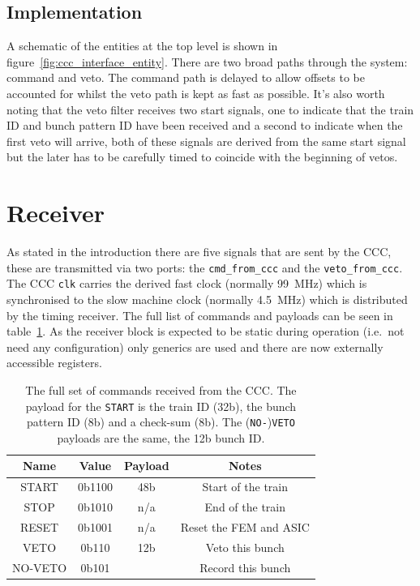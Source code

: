 \subsection{Implementation} %
\label{sub:top_implementation}
A schematic of the entities at the top level is shown in figure~\ref{fig:ccc_interface_entity}. There are two broad paths through the system: command and veto. The command path is delayed to allow offsets to be accounted for whilst the veto path is kept as fast as possible. It's also worth noting that the veto filter receives two start signals, one to indicate that the train ID and bunch pattern ID have been received and a second to indicate when the first veto will arrive, both of these signals are derived from the same start signal but the later has to be carefully timed to coincide with the beginning of vetos.

\section{Receiver} %
\label{sec:receiver}
As stated in the introduction there are five signals that are sent by the CCC, these are transmitted via two ports: the \texttt{cmd\_from\_ccc} and the \texttt{veto\_from\_ccc}. The CCC \texttt{clk} carries the derived fast clock (normally 99~MHz) which is synchronised to the slow machine clock (normally 4.5~MHz) which is distributed by the timing receiver. The full list of commands and payloads can be seen in table~\ref{tab:ccc_commands}. As the receiver block is expected to be static during operation (i.e.\ not need any configuration) only generics are used and there are now externally accessible registers.
\begin{table}[htbp]
  \begin{center}
  \begin{tabular}{c | c | c | c}
    Name     & Value  & Payload & Notes \\
    \hline
    START    & 0b1100 & 48b     & Start of the train \\
    STOP     & 0b1010 & n/a     & End of the train \\
    RESET    & 0b1001 & n/a     & Reset the FEM and ASIC \\
    \hline
    VETO     & 0b110  & 12b     & Veto this bunch \\
    NO-VETO  & 0b101  &         & Record this bunch \\
  \end{tabular}
  \end{center}
  \caption{The full set of commands received from the CCC. The payload for the \texttt{START} is the train ID (32b), the bunch pattern ID (8b) and a check-sum (8b). The (\texttt{NO-})\texttt{VETO} payloads are the same, the 12b bunch ID.}
  \label{tab:ccc_commands}
\end{table}

